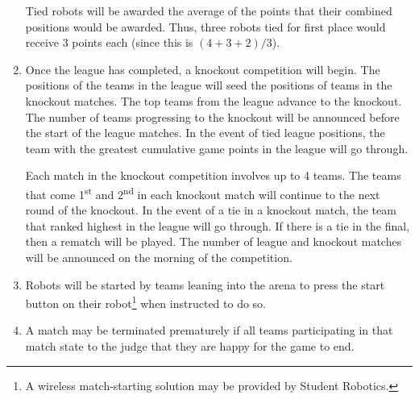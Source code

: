 \begin{enumerate}
      Tied robots will be awarded the average of the points that their combined positions would be awarded.
      Thus, three robots tied for first place would receive 3 points each (since this is $(4+3+2)/3$).

\item Once the league has completed, a knockout competition will begin.
      The positions of the teams in the league will seed the positions of teams in the knockout matches.
      The top teams from the league advance to the knockout.
      The number of teams progressing to the knockout will be announced before the start of the league matches.
      In the event of tied league positions, the team with the greatest cumulative game points in the league will go through.

      Each match in the knockout competition involves up to 4 teams.
      The teams that come 1\textsuperscript{st} and 2\textsuperscript{nd} in each knockout match will continue to the next round of the knockout.
      In the event of a tie in a knockout match, the team that ranked highest in the league will go through.
      If there is a tie in the final, then a rematch will be played.
      The number of league and knockout matches will be announced on the morning of the competition.

\item Robots will be started by teams leaning into the arena to press the start button on their robot\footnote{A wireless match-starting solution may be provided by Student Robotics.} when instructed to do so.

\item A match may be terminated prematurely if all teams participating in that match state to the judge that they are happy for the game to end.

\end{enumerate}
